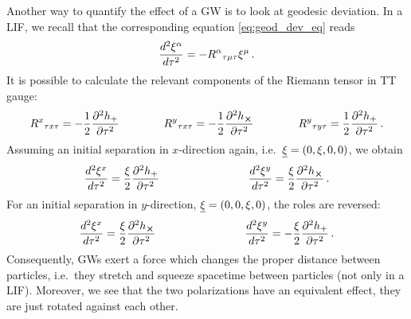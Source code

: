 Another way to quantify the effect of a GW is to look at geodesic deviation. In a LIF, we recall that the corresponding equation \eqref{eq:geod_dev_eq} reads
\begin{equation*}
\dv[2]{\xi^\alpha}{\tau} = - R^\alpha{}_{\tau \mu \tau} \xi^\mu \, .
\end{equation*}
It is possible to calculate the relevant components of the Riemann tensor in TT gauge:
\begin{equation}
R^x{}_{\tau x \tau} = - \frac{1}{2} \pdv[2]{h_+}{\tau} \qquad \qquad R^y{}_{\tau x \tau} = - \frac{1}{2} \pdv[2]{h_{\cross}}{\tau} \qquad \qquad R^y{}_{\tau y \tau} = \frac{1}{2} \pdv[2]{h_+}{\tau} \, .
\end{equation}
Assuming an initial separation in $x$-direction again, i.e.~$\underline{\xi} = \qty(0, \xi, 0, 0)$, we obtain
\begin{equation}
\dv[2]{\xi^x}{\tau} = \frac{\xi}{2} \pdv[2]{h_+}{\tau} \qquad \qquad \qquad \qquad \dv[2]{\xi^y}{\tau} = \frac{\xi}{2} \pdv[2]{h_{\cross}}{\tau} \, .
\end{equation}
For an initial separation in $y$-direction, $\underline{\xi} = \qty(0, 0, \xi, 0)$, the roles are reversed:
\begin{equation}
\dv[2]{\xi^x}{\tau} = \frac{\xi}{2} \pdv[2]{h_{\cross}}{\tau} \qquad \qquad \qquad \qquad \dv[2]{\xi^y}{\tau} = - \frac{\xi}{2} \pdv[2]{h_+}{\tau} \, .
\end{equation}
Consequently, GWs exert a force which changes the proper distance between particles, i.e.~they stretch and squeeze spacetime between particles (not only in a LIF). Moreover, we see that the two polarizations have an equivalent effect, they are just rotated against each other.







